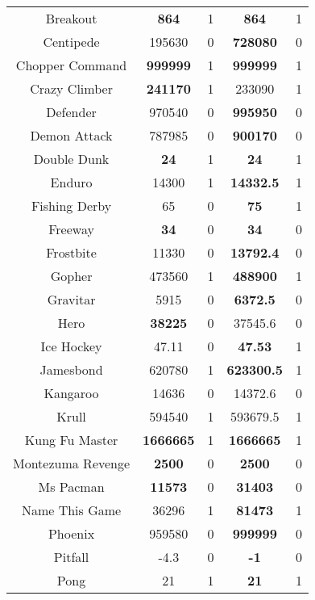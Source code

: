 \begin{table}[!hb]
\begin{center}
\begin{tabular}{c cc cc }
        Breakout &\textbf{{864}}     & 1& \textbf{864} & 1 \\   
        Centipede &195630            & 0 & \textbf{728080} & 0 \\  
        Chopper Command &\textbf{{999999}}   & 1 & \textbf{999999} & 1 \\    
        Crazy Climber &\textbf{241170}	            & 1 & 233090 &1 \\  
        Defender &{970540}  & 0 & \textbf{995950} & 0 \\    
        Demon Attack &{787985}    & 0 & \textbf{900170} & 0 \\  
        Double Dunk &\textbf{{24 }}      & 1 & \textbf{24} & 1 \\  
        Enduro &14300            & 1 & \textbf{14332.5} & 1 \\  
        Fishing Derby &65              & 0 & \textbf{75} & 1 \\  
        Freeway &\textbf{{34}}     & 0 & \textbf{34} & 0 \\    
        Frostbite &11330	            & 0 & \textbf{13792.4} & 0 \\  
        Gopher &473560           & 1 & \textbf{488900} & 1 \\   
        Gravitar  &5915             & 0 & \textbf{6372.5} & 0 \\  
        Hero &\textbf{38225}	           & 0 & 37545.6 & 0 \\   
        Ice Hockey &47.11           & 0  & \textbf{47.53} & 1 \\  
        Jamesbond &{620780	}  & 1 & \textbf{623300.5} & 1 \\    
        Kangaroo &14636           & 0 & 14372.6 & 0 \\  
        Krull &{594540}          & 1 & 593679.5 &1 \\  
        Kung Fu Master &\textbf{{1666665}}	         & 1 & \textbf{1666665} &1 \\    
        Montezuma Revenge &\textbf{2500}            & 0 & \textbf{2500} & 0 \\  
        Ms Pacman &\textbf{11573}           & 0 & \textbf{31403} & 0 \\   
        Name This Game  &36296           & 1 & \textbf{81473} & 1\\  
        Phoenix &{959580 }        & 0 & \textbf{999999} & 0 \\  
        Pitfall  &-4.3            & 0 & \textbf{-1} & 0 \\  
        Pong &{21}     & 1 & \textbf{21} & 1 \\  

\end{tabular}
\end{center}
\end{table}
